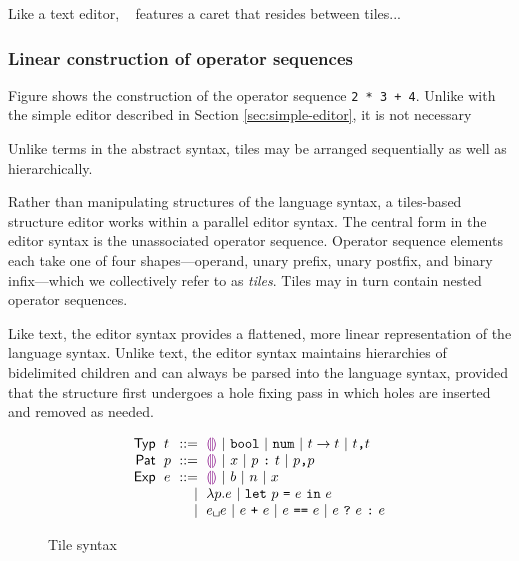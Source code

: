 Like a text editor, \tylr~ features a caret that resides between
tiles...

\subsubsection{Linear construction of operator sequences}
Figure  shows the construction of the operator
sequence \texttt{2 * 3 + 4}. Unlike with the simple editor described
in Section \ref{sec:simple-editor}, it is not necessary

Unlike terms in the abstract syntax, tiles may be arranged
sequentially as well as hierarchically.

Rather than manipulating structures of the language syntax,
a tiles-based structure editor works within a parallel editor syntax.
The central form in the editor syntax is the unassociated operator
sequence. Operator sequence elements each take one of four shapes---operand,
unary prefix, unary postfix, and
binary infix---which we collectively refer to as \emph{tiles}.
Tiles may in turn contain nested operator sequences.

Like text, the editor syntax provides a flattened, more linear representation
of the language syntax.
Unlike text, the editor syntax maintains hierarchies of
bidelimited children and can always be parsed into the
language syntax, provided that the structure first undergoes
a hole fixing pass in which holes are inserted and removed
as needed.


\begin{figure}
  \vspace{-3px}
  \[
  \arraycolsep=3pt\begin{array}{rlrl}
      \mathsf{Typ} & \styp & ::= &
          \shole ~\vert~
          \sbool ~\vert~
          \snum ~\vert~
          \sarr{\styp}{\styp} ~\vert~
          \sprod{\styp}{\styp}\\
      \mathsf{Pat} & \spat & ::= &
        \shole ~\vert~
        \svar{x} ~\vert~
        \sann{p}{\styp} ~\vert~
        \sprod{\spat}{\spat}\\
      \mathsf{Exp} & \sexp & ::= &
        \shole ~\vert~
        \sboollit{b} ~\vert~
        \snumlit{n} ~\vert~
        \svar{x} \\
      & & \vert &
        \slam{\spat}{\sexp} ~\vert~
        \slet{\spat}{\sexp}{\sexp}\\
      & & \vert &
        \sap{\sexp}{\sexp} ~\vert~
        \splus{\sexp}{\sexp} ~\vert~
        \sequals{\sexp}{\sexp} ~\vert~
        \scond{\sexp}{\sexp}{\sexp}
  \end{array}\]
  \caption{
    Tile syntax 
  }
  \label{fig:tile-syntax}
\end{figure}



